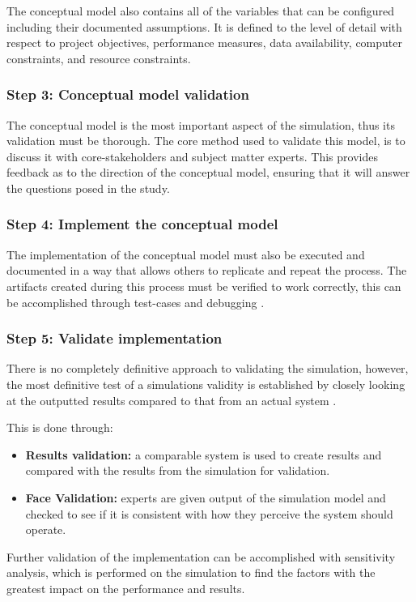 The conceptual model also contains all of the variables that can be configured including their documented assumptions. 
It is defined to the level of detail with respect to project objectives, performance measures, data availability, computer constraints, and resource constraints.

\subsubsection{Step 3: Conceptual model validation}
The conceptual model is the most important aspect of the simulation, thus its validation must be thorough.
The core method used to validate this model, is to discuss it with core-stakeholders and subject matter experts.
This provides feedback as to the direction of the conceptual model, ensuring that it will answer the questions posed in the study.

\subsubsection{Step 4: Implement the conceptual model}
The implementation of the conceptual model must also be executed and documented in a way that allows others to replicate and repeat the process.
The artifacts created during this process must be verified to work correctly, this can be accomplished through test-cases and debugging \cite{Pressman1992}.

\subsubsection{Step 5: Validate implementation}
There is no completely definitive approach to validating the simulation,
however, the most definitive test of a simulations validity is established by closely looking at the outputted results compared to that from an actual system \cite{Law2005}.

This is done through:
\begin{itemize}
  \item \textbf{Results validation: } a comparable system is used to create results and compared with the results from the simulation for validation.
  \item \textbf{Face Validation: } experts are given output of the simulation model and checked to see if it is consistent with how they perceive the system should operate.
\end{itemize}

Further validation of the implementation can be accomplished with sensitivity analysis,
which is performed on the simulation to find the factors with the greatest impact on the performance and results.

